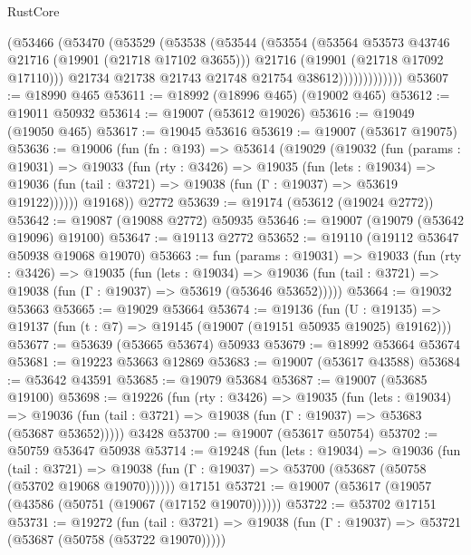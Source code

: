 \begin{lexlean}{RustCore}
\begin{coremodule}
                    (@53466
                      (@53470
                        (@53529
                          (@53538
                            (@53544
                              (@53554
                                (@53564 @53573 @43746 @21716 (@19901 (@21718 @17102 @3655)))
                                @21716
                                (@19901 (@21718 @17092 @17110)))
                              @21734
                              @21738
                              @21743
                              @21748
                              @21754
                              @38612)))))))))))))
@53607 := @18990 @465
@53611 := @18992 (@18996 @465) (@19002 @465)
@53612 := @19011 @50932
@53614 := @19007 (@53612 @19026)
@53616 := @19049 (@19050 @465)
@53617 := @19045 @53616
@53619 := @19007 (@53617 @19075)
@53636 := @19006
    (fun (fn : @193) =>
    @53614
      (@19029
        (@19032
          (fun (params : @19031) =>
          @19033
            (fun (rty : @3426) =>
            @19035
              (fun (lets : @19034) =>
              @19036 (fun (tail : @3721) => @19038 (fun (Γ : @19037) => @53619 @19122))))))
        @19168))
    @2772
@53639 := @19174 (@53612 (@19024 @2772))
@53642 := @19087 (@19088 @2772) @50935
@53646 := @19007 (@19079 (@53642 @19096) @19100)
@53647 := @19113 @2772
@53652 := @19110 (@19112 @53647 @50938 @19068 @19070)
@53663 := fun (params : @19031) =>
  @19033
    (fun (rty : @3426) =>
    @19035
      (fun (lets : @19034) =>
      @19036 (fun (tail : @3721) => @19038 (fun (Γ : @19037) => @53619 (@53646 @53652)))))
@53664 := @19032 @53663
@53665 := @19029 @53664
@53674 := @19136
    (fun (U : @19135) => @19137 (fun (t : @7) => @19145 (@19007 (@19151 @50935 @19025) @19162)))
@53677 := @53639 (@53665 @53674) @50933
@53679 := @18992 @53664 @53674
@53681 := @19223 @53663 @12869
@53683 := @19007 (@53617 @43588)
@53684 := @53642 @43591
@53685 := @19079 @53684
@53687 := @19007 (@53685 @19100)
@53698 := @19226
    (fun (rty : @3426) =>
    @19035
      (fun (lets : @19034) =>
      @19036 (fun (tail : @3721) => @19038 (fun (Γ : @19037) => @53683 (@53687 @53652)))))
    @3428
@53700 := @19007 (@53617 @50754)
@53702 := @50759 @53647 @50938
@53714 := @19248
    (fun (lets : @19034) =>
    @19036
      (fun (tail : @3721) =>
      @19038 (fun (Γ : @19037) => @53700 (@53687 (@50758 (@53702 @19068 @19070))))))
    @17151
@53721 := @19007 (@53617 (@19057 (@43586 (@50751 (@19067 (@17152 @19070))))))
@53722 := @53702 @17151
@53731 := @19272
    (fun (tail : @3721) => @19038 (fun (Γ : @19037) => @53721 (@53687 (@50758 (@53722 @19070)))))

\end{coremodule}
\end{lexlean}
